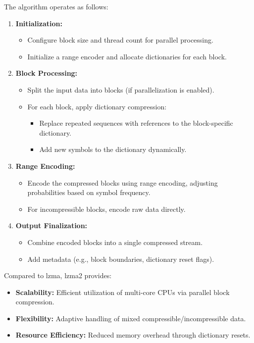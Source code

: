     The algorithm operates as follows:
    \begin{enumerate}[label=\textbf{\roman*.}]
        \item \textbf{Initialization:}
        \begin{itemize}
            \item Configure block size and thread count for parallel processing.
            \item Initialize a range encoder and allocate dictionaries for each block.
        \end{itemize}
        \item \textbf{Block Processing:}
        \begin{itemize}
            \item Split the input data into blocks (if parallelization is enabled).
            \item For each block, apply dictionary compression:
            \begin{itemize}
                \item Replace repeated sequences with references to the block-specific dictionary.
                \item Add new symbols to the dictionary dynamically.
            \end{itemize}
        \end{itemize}
        \item \textbf{Range Encoding:}
        \begin{itemize}
            \item Encode the compressed blocks using range encoding, adjusting probabilities based on symbol frequency.
            \item For incompressible blocks, encode raw data directly.
        \end{itemize}
        \item \textbf{Output Finalization:}
        \begin{itemize}
            \item Combine encoded blocks into a single compressed stream.
            \item Add metadata (e.g., block boundaries, dictionary reset flags).
        \end{itemize}
    \end{enumerate}
    
    Compared to \gls{lzma}, \gls{lzma}2 provides:
    \begin{itemize}
        \item \textbf{Scalability:} Efficient utilization of multi-core CPUs via parallel block compression.
        \item \textbf{Flexibility:} Adaptive handling of mixed compressible/incompressible data.
        \item \textbf{Resource Efficiency:} Reduced memory overhead through dictionary resets.
    \end{itemize}
    
